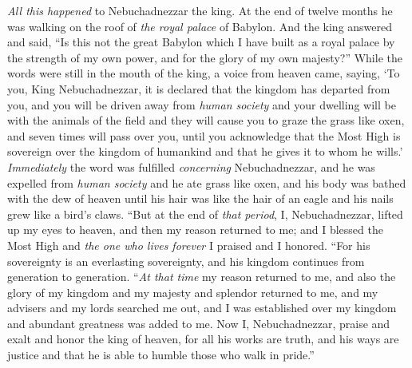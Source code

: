 \begin{biblechapter}
 \textit{All this happened} to Nebuchadnezzar the king.
\verse At the end of twelve months he was walking on the roof of \textit{the royal palace} of Babylon.
\verse And the king answered and said, “Is this not the great Babylon which I have built as a royal palace by the strength of my own power, and for the glory of my own majesty?”
\verse While the words were still in the mouth of the king, a voice from heaven came, saying, ‘To you, King Nebuchadnezzar, it is declared that the kingdom has departed from you,
\verse and you will be driven away from \textit{human society} and your dwelling will be with the animals of the field and they will cause you to graze the grass like oxen, and seven times will pass over you, until you acknowledge that the Most High is sovereign over the kingdom of humankind and that he gives it to whom he wills.’
\verse \textit{Immediately} the word was fulfilled \textit{concerning} Nebuchadnezzar, and he was expelled from \textit{human society} and he ate grass like oxen, and his body was bathed with the dew of heaven until his hair was like the hair of an eagle and his nails grew like a bird’s claws.
 “But at the end of \textit{that period}, I, Nebuchadnezzar, lifted up my eyes to heaven, and then my reason returned to me; and I blessed the Most High and \textit{the one who lives forever} I praised and I honored.
\verse “For his sovereignty is an everlasting sovereignty, 
and his kingdom continues from generation to generation.
\verse “\textit{At that time} my reason returned to me, and also the glory of my kingdom and my majesty and splendor returned to me, and my advisers and my lords searched me out, and I was established over my kingdom and abundant greatness was added to me.
\verse Now I, Nebuchadnezzar, praise and exalt and honor the king of heaven, for all his works are truth, and his ways are justice and that he is able to humble those who walk in pride.”
\end{biblechapter}

